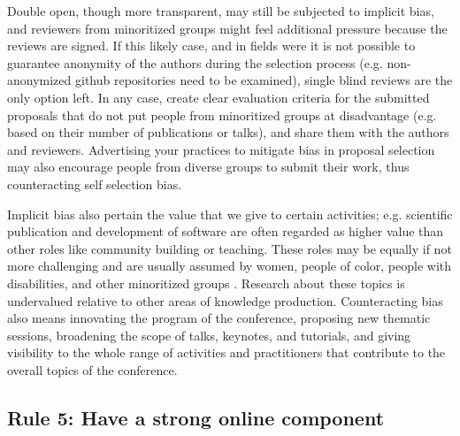 \documentclass[10pt,letterpaper]{article}
\begin{document}
Double open, though more transparent, may still be subjected to implicit bias, and reviewers from minoritized groups might feel additional pressure because the reviews are signed. If this likely case, and in fields were it is not possible to guarantee anonymity of the authors during the selection process (e.g.  non-anonymized github repositories need to be examined), single blind reviews are the only option left.  
In any case, create clear evaluation criteria for the submitted proposals that do not put people from minoritized groups at disadvantage (e.g. based on their number of publications or talks), and share them with the authors and reviewers.
Advertising your practices to mitigate bias in proposal selection may also encourage people from diverse groups to submit their work, thus counteracting self selection bias.


Implicit bias also pertain the value that we give to certain activities; e.g. scientific publication and development of software are often regarded as higher value than other roles like community building or teaching. 
These roles may be equally if not more challenging and are usually assumed by women, people of color, people with disabilities, and other minoritized groups \cite{cheng2020x+, burfordHomelinessMeantHaving2020}. Research about these topics is undervalued relative to other areas of knowledge production. 
Counteracting bias also means innovating the program of the conference, proposing new thematic sessions, broadening the scope of talks, keynotes, and tutorials, and giving visibility to the whole range of activities and practitioners that contribute to the overall topics of the conference. 



\subsection*{Rule 5: Have a strong online component} 
\label{rule_online}
\end{document}
